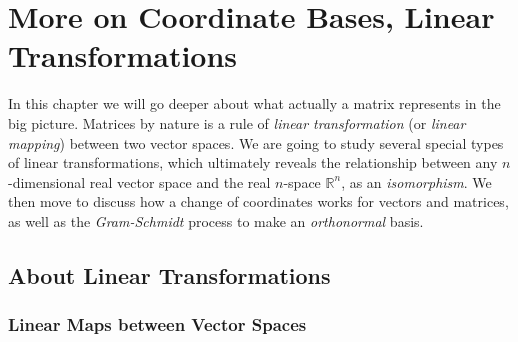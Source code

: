\chapter{More on Coordinate Bases, Linear Transformations}

In this chapter we will go deeper about what actually a matrix represents in the big picture. Matrices by nature is a rule of \textit{linear transformation} (or \textit{linear mapping}) between two vector spaces. We are going to study several special types of linear transformations, which ultimately reveals the relationship between any $n$-dimensional real vector space and the real $n$-space $\mathbb{R}^n$, as an \textit{isomorphism}. We then move to discuss how a change of coordinates works for vectors and matrices, as well as the \textit{Gram-Schmidt} process to make an \textit{orthonormal} basis.

\section{About Linear Transformations}

\subsection{Linear Maps between Vector Spaces}

